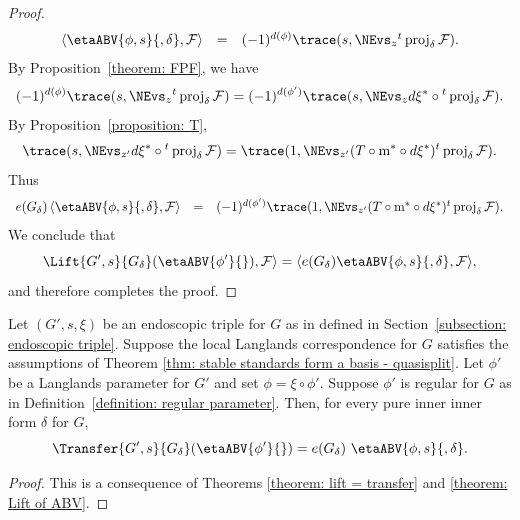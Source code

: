 \documentclass[11pt,letterpaper]{amsart}
\newcommand{\calm}{\textrm{m}}
\numberwithin{equation}{section}
\begin{document}
\begin{proof}
\begin{equation}
\begin{array}{rcl}
\langle
    \etaABV{\phi,s}{,\delta} , \mathcal{F} 
\rangle
    &=&
(-1)^{d(\phi)}
\trace(s,\NEvs_{z}  
{}^t\operatorname{proj}_{\delta} \mathcal{F}).
    \end{array}
\end{equation}
By Proposition~\ref{theorem: FPF}, we have
\[
(-1)^{d(\phi)}
\trace(s,\NEvs_{z} {}^t\operatorname{proj}_{\delta}\mathcal{F})
=
(-1)^{d(\phi')} \trace(s,\NEvs_{z} d\xi^* \circ
{}^t\operatorname{proj}_{\delta} \mathcal{F}).
\]
By Proposition~\ref{proposition: T},
\[
\trace(s,\NEvs_{z'} d\xi^*\circ {}^t\operatorname{proj}_{\delta}\mathcal{F})
=
\trace(1,\NEvs_{z'} (T\circ \calm^*\circ d\xi^*){}^t\operatorname{proj}_{\delta}
\mathcal{F}).
\]
Thus
\[
\begin{array}{rcl}
e(G_\delta)\,
\langle
    \etaABV{\phi,s}{,\delta} ,  \mathcal{F} 
\rangle
    &=&
    (-1)^{d(\phi')}
   \trace(1,\NEvs_{z'} (T\circ \calm^*\circ d\xi^*)
  {}^t\operatorname{proj}_{\delta} \mathcal{F}).
\end{array}
\]
We conclude that 
\[ \Lift{G',s}{G_\delta}( \etaABV{\phi'}{}) , \mathcal{F} 
\rangle= 
\langle
   e(G_\delta) \etaABV{\phi,s}{,\delta} ,  \mathcal{F} 
\rangle,\]
and therefore completes the proof.
\end{proof}





\begin{theorem}\label{theorem: transfer of ABV-distributions}
Let $(G',s,\xi)$ be an endoscopic triple for $G$ as in defined in Section~\ref{subsection: endoscopic triple}.
Suppose the local Langlands correspondence for $G$ satisfies the assumptions of Theorem \ref{thm: stable standards form a basis - quasisplit}. 
Let $\phi'$ be a Langlands parameter for $G'$ and set $\phi = \xi\circ\phi'$.
Suppose $\phi'$ is regular for $G$ as in Definition~\ref{definition: regular parameter}.
Then, for every pure inner inner form $\delta$ for $G$,
\[
\Transfer{G',s}{G_\delta}
(\etaABV{\phi'}{})
=
e(G_\delta)\ 
\etaABV{\phi,s}{,\delta}.
\]
\end{theorem}

\begin{proof}
    This is a consequence of Theorems \ref{theorem: lift = transfer} and \ref{theorem: Lift of ABV}. 
\end{proof}
\end{document}
